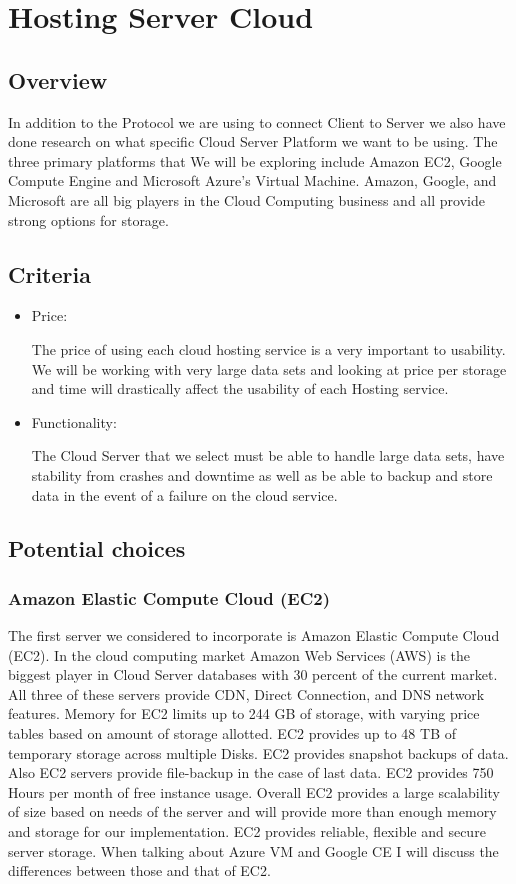 \documentclass[onecolumn, draftclsnofoot,10pt, compsoc]{IEEEtran}
\begin{document}
\section{ Hosting Server Cloud }


\subsection{ Overview }

In addition to the Protocol we are using to connect Client to Server we also have done research on what specific Cloud Server Platform we want to be using. The three primary platforms that We will be exploring include Amazon EC2, Google Compute Engine and Microsoft Azure’s Virtual Machine. Amazon, Google, and Microsoft are all big players in the Cloud Computing business and all provide strong options for storage.
\subsection{ Criteria }

\begin{itemize}
  \item Price:

The price of using each cloud hosting service is a very important to usability. We will be working with very large data sets and looking at price per storage and time will drastically affect the usability of each Hosting service.

  \item Functionality:

 The Cloud Server that we select must be able to handle large data sets, have stability from crashes and downtime as well as be able to backup and store data in the event of a failure on the cloud service.

\end{itemize}

\subsection{ Potential choices }
\subsubsection{ Amazon Elastic Compute Cloud (EC2)}

The first server we considered to incorporate is Amazon Elastic Compute Cloud (EC2). In the cloud computing market Amazon Web Services (AWS) is the biggest player in Cloud Server databases with 30 percent of the current market. All three of these servers provide CDN, Direct Connection, and DNS network features. Memory for EC2 limits up to 244 GB of storage, with varying price tables based on amount of storage allotted. EC2 provides up to 48 TB of temporary storage across multiple Disks. EC2 provides snapshot backups of data. Also EC2 servers provide file-backup in the case of last data. EC2 provides 750 Hours per month of free instance usage. Overall  EC2 provides a large scalability of size based on needs of the server and will provide more than enough memory and storage for our implementation. EC2 provides reliable, flexible and secure server storage. When talking about Azure VM and Google CE I will discuss the differences between those and that of EC2.
\end{document}
